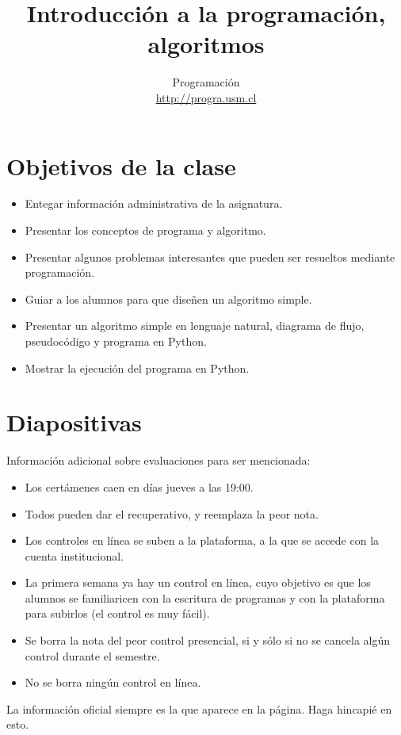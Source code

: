 \documentclass[10pt]{article}
\title{Introducción a la programación, algoritmos}
\author{Programación \\ \url{http://progra.usm.cl}}
\date{}
\begin{document}
  \maketitle

  \section*{Objetivos de la clase}
  \begin{itemize}
    \item Entegar información administrativa de la asignatura.
    \item Presentar los conceptos de programa y algoritmo.
    \item Presentar algunos problemas interesantes
      que pueden ser resueltos mediante programación.
    \item Guiar a los alumnos para que diseñen un algoritmo simple.
    \item Presentar un algoritmo simple en lenguaje natural,
      diagrama de flujo, pseudocódigo y programa en Python.
    \item Mostrar la ejecución del programa en Python.
  \end{itemize}

  \section*{Diapositivas}


  Información adicional sobre evaluaciones
  para ser mencionada:
  \begin{itemize}
    \item Los certámenes caen en días jueves a las 19:00.
    \item Todos pueden dar el recuperativo,
      y reemplaza la peor nota.
    \item Los controles en línea
      se suben a la plataforma,
      a la que se accede con la cuenta institucional.
    \item La primera semana ya hay un control en línea,
      cuyo objetivo es que los alumnos se familiaricen
      con la escritura de programas
      y con la plataforma para subirlos
      (el control es muy fácil).
    \item Se borra la nota del peor control presencial,
      si y sólo si no se cancela algún control durante el semestre.
    \item No se borra ningún control en línea.
  \end{itemize}
  La información oficial siempre es la que aparece en la página.
  Haga hincapié en esto.
\end{document}
